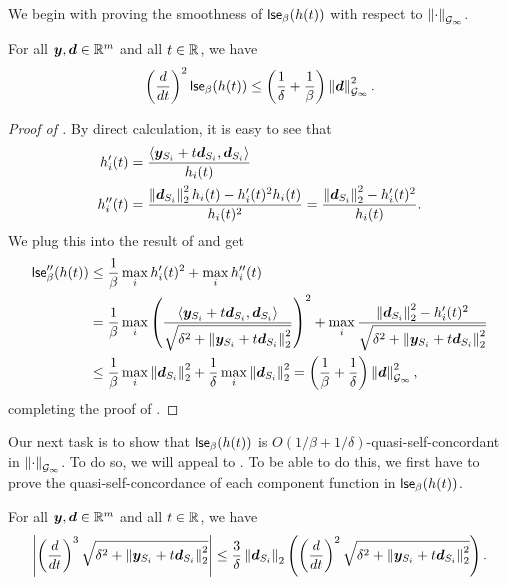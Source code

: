 We begin with proving the smoothness of $\mathsf{lse}_{\beta}(h(t))$ with respect to $\left\lVert \cdot \right\rVert_{\mathcal{G}_{\infty}}$.
\begin{lemma}
\label{lemma:base_smooth}
For all $\bm{y},\bm{d}\in\mathbb{R}^m$ and all $t \in \mathbb{R}$, we have
\begin{align*}
    \left(\frac{d}{dt}\right)^2 \mathsf{lse}_{\beta}(h(t)) \le \left(\frac{1}{\delta}+\frac{1}{\beta}\right)\left\lVert \bm{d} \right\rVert_{\mathcal{G}_{\infty}}^2.
\end{align*}
\end{lemma}
\begin{proof}[Proof of ]
By direct calculation, it is easy to see that
\begin{equation}\label{eq:hi_derivatives}
    \begin{aligned}
         h_i'(t) &= \frac{\left\langle \bm{y}_{S_i}+t\bm{d}_{S_i},\bm{d}_{S_i} \right\rangle}{h_i(t)} \\
         h_i''(t) &= \frac{\left\lVert \bm{d}_{S_i} \right\rVert_2^2 h_i(t) - h_i'(t)^2h_i(t)}{h_i(t)^2} = \frac{\left\lVert \bm{d}_{S_i} \right\rVert_2^2-h_i'(t)^2}{h_i(t)}.
    \end{aligned}
\end{equation}
We plug this into the result of  and get
\begin{align*}
    \mathsf{lse}_{\beta}''(h(t)) &\le \frac{1}{\beta}\max_i h_i'(t)^2 + \max_i h_i''(t) \\
    &= \frac{1}{\beta} \max_{i}\left(\frac{\left\langle \bm{y}_{S_i}+t\bm{d}_{S_i},\bm{d}_{S_i} \right\rangle}{\sqrt{\delta^2 + \left\lVert \bm{y}_{S_i}+t\bm{d}_{S_i} \right\rVert_2^2}}\right)^2 + \max_{i} \frac{\left\lVert \bm{d}_{S_i} \right\rVert_2^2 - h_i'(t)^2}{\sqrt{\delta^2+\left\lVert \bm{y}_{S_i}+t\bm{d}_{S_i} \right\rVert_2^2}} \\
    &\le \frac{1}{\beta}\max_{i} \left\lVert \bm{d}_{S_i} \right\rVert_2^2 + \frac{1}{\delta}\max_{i}\left\lVert \bm{d}_{S_i} \right\rVert_2^2 = \left(\frac{1}{\beta}+\frac{1}{\delta}\right)\left\lVert \bm{d} \right\rVert_{\mathcal{G}_{\infty}}^2,
\end{align*}
completing the proof of .
\end{proof}
Our next task is to show that $\mathsf{lse}_{\beta}(h(t))$ is $O(1/\beta + 1/\delta)$-quasi-self-concordant in $\left\lVert \cdot \right\rVert_{\mathcal{G}_{\infty}}$. To do so, we will appeal to . To be able to do this, we first have to prove the quasi-self-concordance of each component function in $\mathsf{lse}_{\beta}(h(t))$.
\begin{lemma}
\label{lemma:hi_qsc}
For all $\bm{y},\bm{d}\in\mathbb{R}^m$ and all $t\in\mathbb{R}$, we have
\begin{align*}
    \left\lvert \left(\frac{d}{dt}\right)^3 \sqrt{\delta^2+\left\lVert \bm{y}_{S_i}+t\bm{d}_{S_i} \right\rVert_2^2} \right\rvert \le \frac{3}{\delta}\left\lVert \bm{d}_{S_i} \right\rVert_2\left(\left(\frac{d}{dt}\right)^2\sqrt{\delta^2+\left\lVert \bm{y}_{S_i}+t\bm{d}_{S_i} \right\rVert_2^2}\right).
\end{align*}
\end{lemma}
